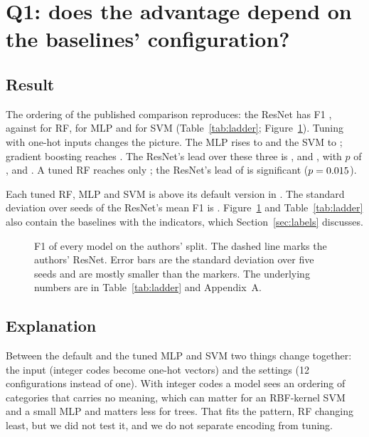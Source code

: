 \documentclass[11pt,a4paper]{article}
\begin{document}
\section{Q1: does the advantage depend on the baselines' configuration?}\label{sec:baselines}

\subsection{Result}
The ordering of the published comparison reproduces: the ResNet has F1 \fResnet{}, against \fRfTheirs{} for RF, \fMlpRawTheirs{} for MLP and \fSvmTheirs{} for SVM (Table~\ref{tab:ladder}; Figure~\ref{fig:ladder}). Tuning with one-hot inputs changes the picture. The MLP rises to \fMlpTuned{} and the SVM to \fSvmTuned{}; gradient boosting reaches \fGbTuned{}. The ResNet's lead over these three is \dMlpTuned{}, \dSvmTuned{} and \dGbTuned{}, with $p$ of \pMlpTuned{}, \pSvmTuned{} and \pGbTuned{}. A tuned RF reaches only \fRfTuned{}; the ResNet's lead of \dRfTuned{} is significant ($p=0.015$).

Each tuned RF, MLP and SVM is above its default version in \seedOrderConfig{}. The standard deviation over seeds of the ResNet's mean F1 is \seedSdResnet{}. Figure~\ref{fig:ladder} and Table~\ref{tab:ladder} also contain the baselines with the indicators, which Section~\ref{sec:labels} discusses.

\begin{figure}[t]
\centering

\caption{F1 of every model on the authors' split. The dashed line marks the authors' ResNet. Error bars are the standard deviation over five seeds and are mostly smaller than the markers. The underlying numbers are in Table~\ref{tab:ladder} and Appendix~A.}
\label{fig:ladder}
\end{figure}

\begin{table}[t]
\centering\footnotesize

\caption{The authors' ResNet minus each baseline (F1, mean over the eight datasets). \emph{Datasets won}: datasets on which the ResNet is higher. $p$: paired $t$-test over the datasets. }
\label{tab:ladder}
\end{table}

\subsection{Explanation}
Between the default and the tuned MLP and SVM two things change together: the input (integer codes become one-hot vectors) and the settings (12 configurations instead of one). With integer codes a model sees an ordering of categories that carries no meaning, which can matter for an RBF-kernel SVM and a small MLP and matters less for trees. That fits the pattern, RF changing least, but we did not test it, and we do not separate encoding from tuning.
\end{document}
